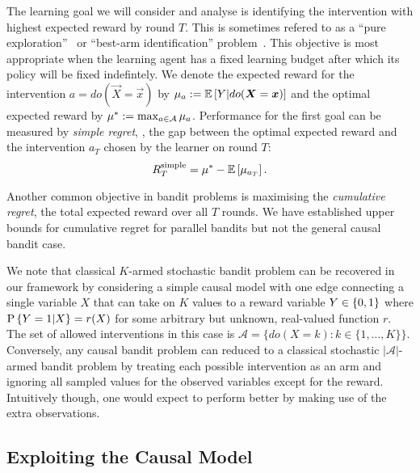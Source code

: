The learning goal we will consider and analyse is identifying the intervention with highest expected reward by round $T$.
This is sometimes refered to as a ``pure exploration''~\citep{Bubeck2009} or ``best-arm identification'' problem~\citep{Gabillon2012}.
This objective is most appropriate when the learning agent has a fixed learning budget after which its policy will be fixed indefintely. 
We denote the expected reward for the intervention $a = do(\vec{X} = \vec{x})$ by $\mu_{a} := \E{Y | do(\vec{X} = \vec{x})}$ and the optimal expected reward by $\mu^* := \max_{a\in\actions} \mu_{a}$.
Performance for the first goal can be measured by \emph{simple regret}, \ie, the gap between the optimal expected reward and the intervention $a_T$ chosen by the learner on round $T$:
\begin{equation}
\label{eq:regret-simple}
	\simpleregret = \mu^* - \E{\mu_{a_T}}.
\end{equation}

Another common objective in bandit problems is maximising the \emph{cumulative regret}, the total expected reward over all $T$ rounds. 
We have established upper bounds for cumulative regret for parallel bandits but not the general causal bandit case.

We note that classical $K$-armed stochastic bandit problem can be recovered in our framework by considering a simple causal model with one edge connecting a single variable $X$ that can take on $K$ values to a reward variable $Y \in \set{0,1}$ where $\P{Y = 1|X} = r(X)$ for some arbitrary but unknown, real-valued function $r$.
The set of allowed interventions in this case is $\mathcal{A} = \{ do(X = k) \colon k \in \{1, \ldots, K\}\}$.
Conversely, any causal bandit problem can reduced to a classical stochastic $|\mathcal{A}|$-armed bandit problem by treating each possible intervention as an arm and ignoring all sampled values for the observed variables except for the reward.
Intuitively though, one would expect to perform better by making use of the extra observations.





\subsection{Exploiting the Causal Model}


